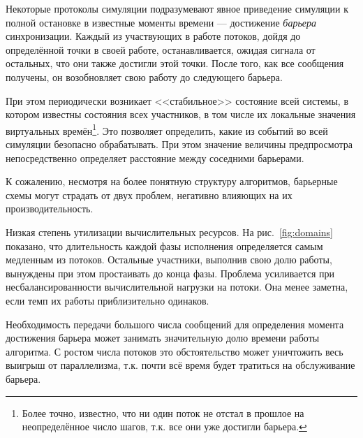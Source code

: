 Некоторые протоколы симуляции подразумевают явное приведение симуляции к полной остановке в известные моменты времени --- достижение \textit{барьера} синхронизации. Каждый из участвующих в работе потоков, дойдя до определённой точки в своей работе, останавливается, ожидая сигнала от остальных, что они также достигли этой точки. После того, как все сообщения получены, он возобновляет свою работу до следующего барьера.

При этом периодически возникает <<стабильное>> состояние всей системы, в котором известны состояния всех участников, в том числе их локальные значения виртуальных времён\footnote{Более точно, известно, что ни один поток не отстал в прошлое на неопределённое число шагов, т.к. все они уже достигли барьера.}. Это позволяет определить, какие из событий во всей симуляции безопасно обрабатывать. При этом значение величины предпросмотра непосредственно определяет расстояние между соседними барьерами.

К сожалению, несмотря на более понятную структуру алгоритмов, барьерные схемы могут страдать от двух проблем, негативно влияющих на их производительность.

\begin{enumerate*}
    \item Низкая степень утилизации вычислительных ресурсов. На рис.~\ref{fig:domains} показано, что длительность каждой фазы исполнения определяется самым медленным из потоков. Остальные участники, выполнив свою долю работы, вынуждены при этом простаивать до конца фазы. Проблема усиливается при несбалансированности вычислительной нагрузки на потоки. Она менее заметна, если темп их работы приблизительно одинаков.
    \item Необходимость передачи большого числа сообщений для определения момента достижения барьера может занимать значительную долю времени работы алгоритма. С ростом числа потоков это обстоятельство может уничтожить весь выигрыш от параллелизма, т.к. почти всё время будет тратиться на обслуживание барьера.
\end{enumerate*}

